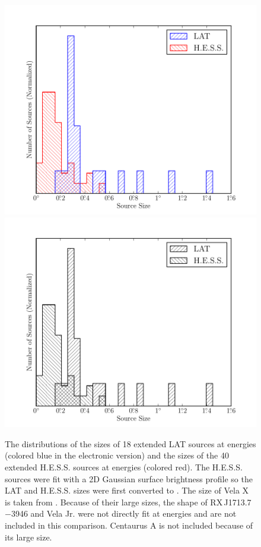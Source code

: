 \clearpage
\begin{figure}
    \ifcolorfigure
      \includegraphics{summary_plots/gev_vs_tev_histogram_color.pdf}
    \else
      \includegraphics{summary_plots/gev_vs_tev_histogram_bw.pdf}
    \fi
    \caption{
    The distributions of the sizes of 18 extended LAT sources
    at \gev energies
    (colored blue in the electronic version) and the sizes of the
    40 extended H.E.S.S. sources at \tev energies
    (colored red).  
    The H.E.S.S. sources were fit with a 2D Gaussian surface
    brightness profile so the LAT and H.E.S.S. sizes were first converted
    to \rsixeight. 
    The \gev size of Vela X is taken from \cite{abdo_2010c_fermi-large}.  
    Because of their large sizes, the shape of RX\,J1713.7$-$3946 and
    Vela Jr. were not directly fit at \tev energies
    and are not included in this comparison.
    Centaurus A is not included because of its large size.
    }
  \end{figure}

